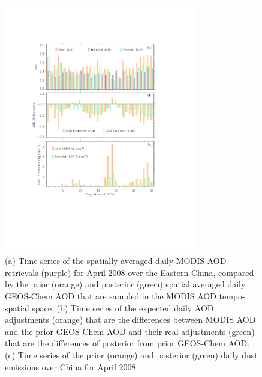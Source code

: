  \begin{figure}[t]
  \centering
  \includegraphics[width={0.75\textwidth}]{figures/a4.pdf}
  \caption{(a) Time series of the spatially averaged daily MODIS AOD retrievals (purple) for April 2008 over the Eastern China, compared by the prior (orange) and posterior (green) spatial averaged daily GEOS-Chem AOD that are sampled in the MODIS AOD tempo-spatial space. (b) Time series of the expected daily AOD adjustments (orange) that are the differences between MODIS AOD and the prior GEOS-Chem AOD and their real adjustments (green) that are the differences of posterior from prior GEOS-Chem AOD. (c) Time series of the prior (orange) and posterior (green) daily dust emissions over China for April 2008.}
  \label{fig:dailyaod}
 \end{figure}




